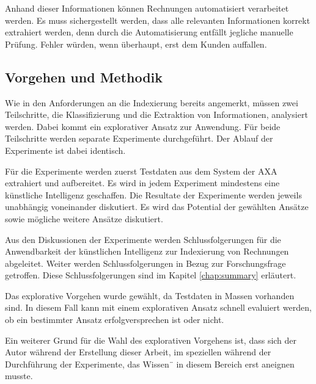 Anhand dieser Informationen können Rechnungen automatisiert verarbeitet werden. Es muss sichergestellt werden, dass alle relevanten Informationen korrekt extrahiert werden, denn durch die Automatisierung entfällt jegliche manuelle Prüfung. Fehler würden, wenn überhaupt, erst dem Kunden auffallen. 

\subsection{Vorgehen und Methodik}
\label{chap:vorgehen}

Wie in den Anforderungen an die Indexierung bereits angemerkt, müssen zwei Teilschritte, die Klassifizierung und die Extraktion von Informationen, analysiert werden. Dabei kommt ein explorativer Ansatz zur Anwendung. Für beide Teilschritte werden separate Experimente durchgeführt. Der Ablauf der Experimente ist dabei identisch. 

Für die Experimente werden zuerst Testdaten aus dem System der AXA extrahiert und aufbereitet. Es wird in jedem Experiment mindestens eine künstliche Intelligenz geschaffen. Die Resultate der Experimente werden jeweils unabhängig voneinander diskutiert. Es wird das Potential der gewählten Ansätze sowie mögliche weitere Ansätze diskutiert.

Aus den Diskussionen der Experimente werden Schlussfolgerungen für die Anwendbarkeit der künstlichen Intelligenz zur Indexierung von Rechnungen abgeleitet. Weiter werden Schlussfolgerungen in Bezug zur Forschungsfrage getroffen. Diese Schlussfolgerungen sind im Kapitel \ref{chap:summary} erläutert.

Das explorative Vorgehen wurde gewählt, da Testdaten in Massen vorhanden sind. In diesem Fall kann mit einem explorativen Ansatz schnell evaluiert werden, ob ein bestimmter Ansatz erfolgversprechen ist oder nicht.

Ein weiterer Grund für die Wahl des explorativen Vorgehens ist, dass sich der Autor während der Erstellung dieser Arbeit, im speziellen während der Durchführung der Experimente, das Wissen¨ in diesem Bereich erst aneignen musste.
